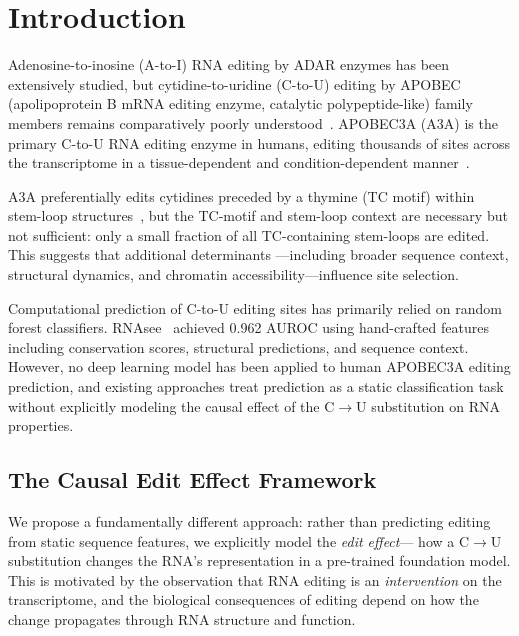 \documentclass[11pt]{article}
\begin{document}
\section{Introduction}

Adenosine-to-inosine (A-to-I) RNA editing by ADAR enzymes has been extensively
studied, but cytidine-to-uridine (C-to-U) editing by APOBEC (apolipoprotein B
mRNA editing enzyme, catalytic polypeptide-like) family members remains
comparatively poorly understood~\citep{blanc2014}. APOBEC3A (A3A) is the primary
C-to-U RNA editing enzyme in humans, editing thousands of sites across the
transcriptome in a tissue-dependent and condition-dependent
manner~\citep{sharma2015, asaoka2019}.

A3A preferentially edits cytidines preceded by a thymine (TC motif) within
stem-loop structures~\citep{jalili2023}, but the TC-motif and stem-loop
context are necessary but not sufficient: only a small fraction of all
TC-containing stem-loops are edited. This suggests that additional determinants
---including broader sequence context, structural dynamics, and chromatin
accessibility---influence site selection.

Computational prediction of C-to-U editing sites has primarily relied on
random forest classifiers. RNAsee~\citep{baysal2024} achieved 0.962 AUROC using
hand-crafted features including conservation scores, structural predictions, and
sequence context. However, no deep learning model has been applied to human
APOBEC3A editing prediction, and existing approaches treat prediction as a
static classification task without explicitly modeling the causal effect of the
C$\to$U substitution on RNA properties.

\subsection{The Causal Edit Effect Framework}

We propose a fundamentally different approach: rather than predicting editing
from static sequence features, we explicitly model the \emph{edit effect}---
how a C$\to$U substitution changes the RNA's representation in a pre-trained
foundation model. This is motivated by the observation that RNA editing is an
\emph{intervention} on the transcriptome, and the biological consequences of
editing depend on how the change propagates through RNA structure and function.
\end{document}
